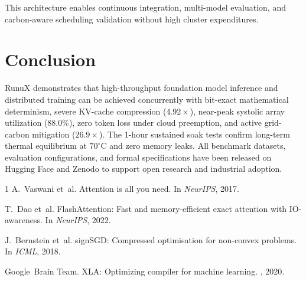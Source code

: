 \documentclass[10pt,twocolumn]{article}
\begin{document}
This architecture enables continuous integration, multi-model evaluation, and carbon-aware scheduling validation without high cluster expenditures.

\section{Conclusion}

RunuX demonstrates that high-throughput foundation model inference and distributed training can be achieved concurrently with bit-exact mathematical determinism, severe KV-cache compression ($4.92\times$), near-peak systolic array utilization (88.0\%), zero token loss under cloud preemption, and active grid-carbon mitigation ($26.9\times$). The 1-hour sustained soak tests confirm long-term thermal equilibrium at $70^\circ\mathrm{C}$ and zero memory leaks. All benchmark datasets, evaluation configurations, and formal specifications have been released on Hugging Face and Zenodo to support open research and industrial adoption.


\begin{thebibliography}{1}
A.~Vaswani et~al.
\newblock Attention is all you need.
\newblock In {\em NeurIPS}, 2017.

T.~Dao et~al.
\newblock FlashAttention: Fast and memory-efficient exact attention with IO-awareness.
\newblock In {\em NeurIPS}, 2022.

J.~Bernstein et~al.
\newblock signSGD: Compressed optimisation for non-convex problems.
\newblock In {\em ICML}, 2018.

Google~Brain Team.
\newblock XLA: Optimizing compiler for machine learning.
, 2020.
\end{thebibliography}
\end{document}
